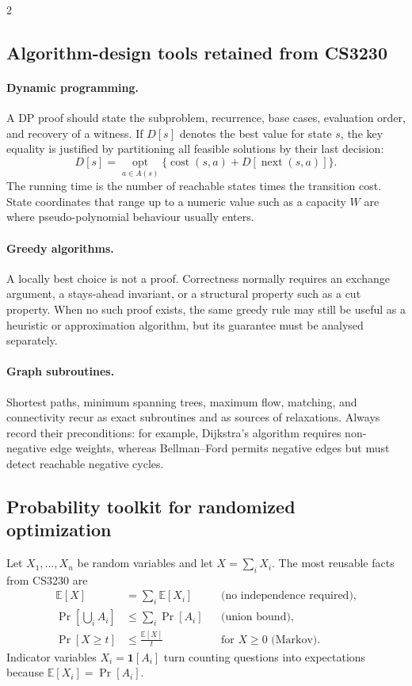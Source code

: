 \documentclass[8pt]{extarticle}
\theoremstyle{definition}
\begin{document}
\begin{multicols*}{2}
\subsection{Algorithm-design tools retained from CS3230}

\paragraph{Dynamic programming.}
A DP proof should state the subproblem, recurrence, base cases, evaluation
order, and recovery of a witness.  If $D[s]$ denotes the best value for state
$s$, the key equality is justified by partitioning all feasible solutions by
their last decision:
\[
  D[s]=\operatorname*{opt}_{a\in A(s)}
       \{\operatorname{cost}(s,a)+D[\operatorname{next}(s,a)]\}.
\]
The running time is the number of reachable states times the transition cost.
State coordinates that range up to a numeric value such as a capacity $W$ are
where pseudo-polynomial behaviour usually enters.

\paragraph{Greedy algorithms.}
A locally best choice is not a proof.  Correctness normally requires an
exchange argument, a stays-ahead invariant, or a structural property such as
a cut property.  When no such proof exists, the same greedy rule may still be
useful as a heuristic or approximation algorithm, but its guarantee must be
analysed separately.

\paragraph{Graph subroutines.}
Shortest paths, minimum spanning trees, maximum flow, matching, and
connectivity recur as exact subroutines and as sources of relaxations.  Always
record their preconditions: for example, Dijkstra's algorithm requires
non-negative edge weights, whereas Bellman--Ford permits negative edges but
must detect reachable negative cycles.

\subsection{Probability toolkit for randomized optimization}

Let $X_1,\ldots,X_n$ be random variables and let
$X=\sum_i X_i$.  The most reusable facts from CS3230 are
\begin{align*}
\mathbb{E}[X]&=\sum_i\mathbb{E}[X_i]
&&\text{(no independence required)},\\
\Pr\!\left[\bigcup_i A_i\right]&\le\sum_i\Pr[A_i]
&&\text{(union bound)},\\
\Pr[X\ge t]&\le\frac{\mathbb{E}[X]}{t}
&&\text{for $X\ge0$ (Markov)}.
\end{align*}
Indicator variables $X_i=\mathbf{1}[A_i]$ turn counting questions into
expectations because $\mathbb{E}[X_i]=\Pr[A_i]$.


\end{multicols*}
\end{document}
